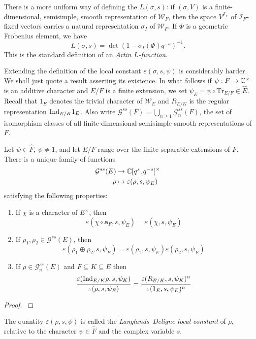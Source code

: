 \begin{rem}
	There is a more uniform way of defining the $L(\sigma, s)$: if $(\sigma, V)$ is a finite-dimensional, semisimple, smooth representation of $\mathcal{W}_F$, then the space $V^{\mathcal{I}_F}$ of $\mathcal{I}_F$-fixed vectors carries a natural representation $\sigma_{I}$ of $\mathcal{W}_F$. If $\Phi$ is a geometric Frobenius element, we have
	\[L(\sigma, s) = \det(1 - \sigma_I(\Phi)q^{-s})^{-1}.\]
	This is the standard definition of an \emph{Artin $L$-function}. 
\end{rem}
Extending the definition of the local constant $\varepsilon(\sigma, s, \psi)$ is considerably harder. We shall just quote a result asserting its existence. In what follows if $\psi: F\to \mathbb{C}^\times$ is an additive character and $E/F$ is a finite extension, we set $\psi_E = \psi \circ \mathrm{Tr}_{E/F}\in \widehat{E}$. Recall that $1_E$ denotes the trivial character of $\mathcal{W}_E$ and $R_{E/K}$ is the regular representation $\mathrm{Ind}_{E/K} 1_E$. Also write $\mathcal{G}^{ss}(F) = \bigcup_{n\ge 1} \mathcal{G}^{ss}_n(F)$, the set of isomorphism classes of all finite-dimensional semisimple smooth representations of $F$.
\begin{thm}
	Let $\psi\in \widehat{F}$, $\psi\not=1$, and let $E/F$ range over the finite separable extensions of $F$. There is a unique family of functions
	\begin{align*}
		\mathcal{G}^{ss}(E)&\to \mathbb{C}[q^s, q^{-s}]^\times\\
		\rho &\mapsto \varepsilon(\rho, s, \psi_E)
	\end{align*}
	satisfying the following properties:
	\begin{enumerate}
		\item If $\chi$ is a character of $E^\times$, then
		\[\varepsilon(\chi\circ \mathbf{a}_F, s, \psi_E) = \varepsilon(\chi, s, \psi_E)\]
		\item If $\rho_1, \rho_2\in \mathcal{G}^{ss}(E)$, then
		\[\varepsilon(\rho_1\oplus \rho_2, s, \psi_E) = \varepsilon(\rho_1, s, \psi_E)\varepsilon(\rho_2, s, \psi_E)\] 
		\item If $\rho \in \mathcal{G}^{ss}_n(E)$ and $F\subseteq K\subseteq E$ then
		\[\frac{\varepsilon(\mathrm{Ind}_{E/K}\rho, s, \psi_K)}{\varepsilon(\rho, s, \psi_E)} = \frac{\varepsilon(R_{E/K}, s, \psi_K)^n}{\varepsilon(1_E, s, \psi_E)^n}\]
	\end{enumerate}
\end{thm}
\begin{proof}
	\cite[Theorem 29.4]{BH1}
\end{proof}
The quantity $\varepsilon(\rho, s, \psi)$ is called the \emph{Langlands--Deligne local constant} of $\rho$, relative to the character $\psi\in \widehat{F}$ and the complex variable $s$.

